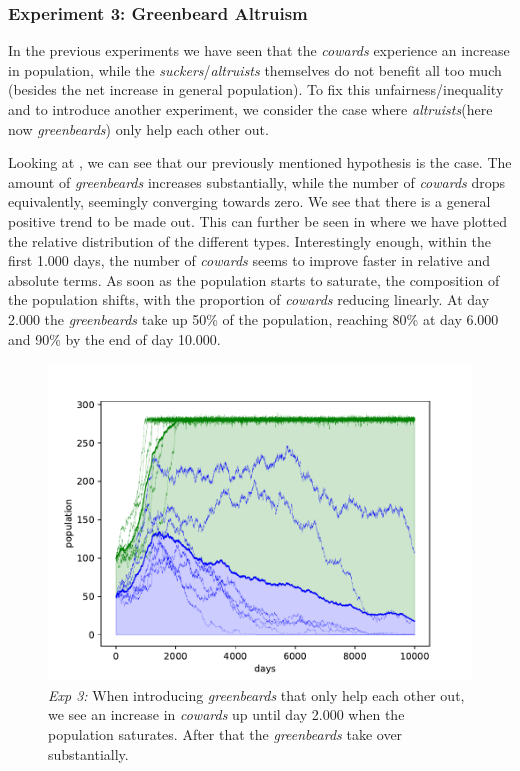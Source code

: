 \documentclass[sigconf]{acmart}
\newcommand{\cowards}{\textit{cowards}\xspace}
\newcommand{\altruists}{\textit{altruists}\xspace}
\newcommand{\suckers}{\textit{suckers}\xspace}
\newcommand{\greenbeards}{\textit{greenbeards}\xspace}
\begin{document}
    \subsubsection*{Experiment 3: Greenbeard Altruism}
    In the previous experiments we have seen that the \cowards experience an increase in population, while the \suckers/\altruists themselves do not benefit all too much (besides the net increase in general population).
    To fix this unfairness/inequality and to introduce another experiment, we consider the case where \altruists (here now \greenbeards) only help each other out.

    Looking at , we can see that our previously mentioned hypothesis is the case.
    The amount of \greenbeards increases substantially, while the number of \cowards drops equivalently, seemingly converging towards zero.
    We see that there is a general positive trend to be made out.
    This can further be seen in  where we have plotted the relative distribution of the different types.
    Interestingly enough, within the first 1.000 days, the number of \cowards seems to improve faster in relative and absolute terms.
    As soon as the population starts to saturate, the composition of the population shifts, with the proportion of \cowards reducing linearly.
    At day 2.000 the \greenbeards take up 50\% of the population, reaching 80\% at day 6.000 and 90\% by the end of day 10.000.



    \begin{figure}
        \includegraphics[width=\columnwidth]{figures/exp3_greebeard}
        \caption{\textit{Exp 3:} When introducing \greenbeards that only help each other out, we see an increase in \cowards up until day 2.000 when the population saturates.
        After that the \greenbeards take over substantially.}
        \label{fig:exp3_greenbeard}
    \end{figure}
\end{document}
